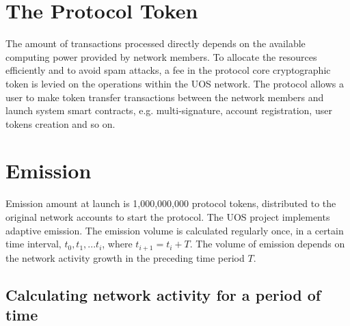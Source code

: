\documentclass[a4paper,12pt]{article}
\begin{document}
\section{The Protocol Token}

The amount of transactions processed directly depends on the available computing power provided by network members. To allocate the resources efficiently and to avoid spam attacks, a fee in the protocol core cryptographic token is levied on the operations within the U{\degree}OS network. The protocol allows a user to make token transfer transactions between the network members and launch system smart contracts, e.g. multi-signature, account registration, user tokens creation and so on.


\section{Emission}

Emission amount at launch is 1,000,000,000 protocol tokens, distributed to the original network accounts to start the protocol. The U{\degree}OS project implements adaptive emission. The emission volume is calculated regularly once, in a certain time interval, $t_0, t_1, ... t_i$, where $t_{i+1} = t_i + T$. The volume of emission depends on the network activity growth in the preceding time period $T$.


\subsection{Calculating network activity for a period of time}
\end{document}
